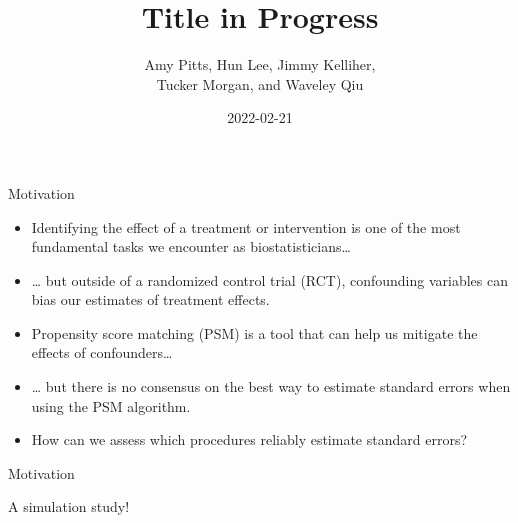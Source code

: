 \documentclass[
  ignorenonframetext,
]{beamer}
\title{Title in Progress}
\author{Amy Pitts, Hun Lee, Jimmy Kelliher,\\
Tucker Morgan, and Waveley Qiu}
\date{2022-02-21}
\providecommand{\tightlist}{%
  \setlength{\itemsep}{0pt}\setlength{\parskip}{0pt}}
\begin{document}
\frame{\titlepage}

\begin{frame}{Motivation}
\protect\hypertarget{motivation}{}

\begin{itemize}[<+->]
\tightlist
\item
  Identifying the effect of a treatment or intervention is one of the
  most fundamental tasks we encounter as biostatisticians\ldots{}
\end{itemize}

\begin{itemize}[<+->]
\tightlist
\item
  \ldots{} but outside of a randomized control trial (RCT), confounding
  variables can bias our estimates of treatment effects.
\end{itemize}

\begin{itemize}[<+->]
\tightlist
\item
  Propensity score matching (PSM) is a tool that can help us mitigate
  the effects of confounders\ldots{}
\end{itemize}

\begin{itemize}[<+->]
\tightlist
\item
  \ldots{} but there is no consensus on the best way to estimate
  standard errors when using the PSM algorithm.
\end{itemize}

\begin{itemize}[<+->]
\tightlist
\item
  How can we assess which procedures reliably estimate standard errors?
\end{itemize}

\end{frame}

\begin{frame}{Motivation}
\protect\hypertarget{motivation-1}{}

\begin{center}
  A simulation study!
\end{center}

\end{frame}
\end{document}
